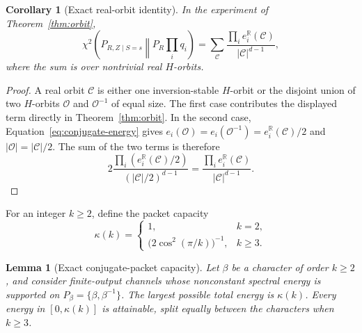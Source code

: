 \documentclass[11pt]{article}
\newtheorem{lemma}[theorem]{Lemma}
\newtheorem{corollary}[theorem]{Corollary}
\theoremstyle{definition}
\newcommand{\chitwo}{\chi^2}
\begin{document}
\begin{corollary}[Exact real-orbit identity]\label{cor:real-orbit}
In the experiment of Theorem~\ref{thm:orbit},
\begin{equation}\label{eq:real-orbit}
 \chitwo\left(P_{R,Z\mid S=s}\middle\Vert P_R\prod_iq_i\right)
 =\sum_{\mathcal C}
   \frac{\prod_i e_i^{\mathbb R}(\mathcal C)}
        {|\mathcal C|^{d-1}},
\end{equation}
where the sum is over nontrivial real $H$-orbits.
\end{corollary}

\begin{proof}
A real orbit $\mathcal C$ is either one inversion-stable $H$-orbit or the
disjoint union of two $H$-orbits $\mathcal O$ and $\mathcal O^{-1}$ of equal
size.  The first case contributes the displayed term directly in
Theorem~\ref{thm:orbit}.  In the second case,
Equation~\eqref{eq:conjugate-energy} gives
$e_i(\mathcal O)=e_i(\mathcal O^{-1})=
e_i^{\mathbb R}(\mathcal C)/2$ and
$|\mathcal O|=|\mathcal C|/2$.  The sum of the two terms is therefore
\[
 2\frac{\prod_i(e_i^{\mathbb R}(\mathcal C)/2)}
          {( |\mathcal C|/2)^{d-1}}
 =\frac{\prod_i e_i^{\mathbb R}(\mathcal C)}{|\mathcal C|^{d-1}}.
\]
\end{proof}

For an integer $k\geq2$, define the packet capacity
\begin{equation}\label{eq:packet-capacity}
 \kappa(k)=
 \begin{cases}
  1,&k=2,\\
  \bigl(2\cos^2(\pi/k)\bigr)^{-1},&k\geq3.
 \end{cases}
\end{equation}

\begin{lemma}[Exact conjugate-packet capacity]\label{lem:packet-capacity}
Let $\beta$ be a character of order $k\geq2$, and consider finite-output
channels whose nonconstant spectral energy is supported on
$P_\beta=\{\beta,\beta^{-1}\}$.  The largest possible total energy is
$\kappa(k)$.  Every energy in $[0,\kappa(k)]$ is attainable, split equally
between the characters when $k\geq3$.
\end{lemma}
\end{document}

